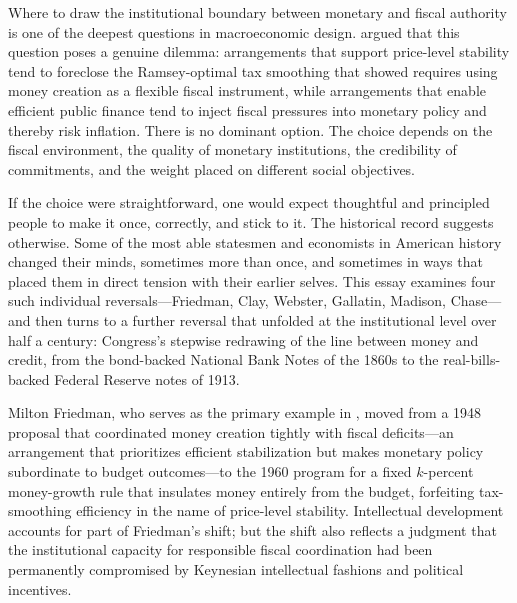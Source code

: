 \documentclass[12pt]{article}
\begin{document}
Where to draw the institutional boundary between monetary and fiscal
authority is one of the deepest questions in macroeconomic design.
\citet{Sargent2011} argued that this question poses a genuine dilemma:
arrangements that support price-level stability tend to foreclose the
Ramsey-optimal tax smoothing that \citet{LucasStokey1983} showed
requires using money creation as a flexible fiscal instrument, while
arrangements that enable efficient public finance tend to inject fiscal
pressures into monetary policy and thereby risk inflation.  There is no
dominant option.  The choice depends on the fiscal environment,
the quality of monetary institutions, the credibility of commitments,
and the weight placed on different social objectives.

If the choice were straightforward, one would expect thoughtful and
principled people to make it once, correctly, and stick to it.  The
historical record suggests otherwise.  Some of the most able statesmen
and economists in American history changed their minds, sometimes more
than once, and sometimes in ways that placed them in direct tension with
their earlier selves.  This essay examines four such individual
reversals---Friedman, Clay, Webster, Gallatin, Madison, Chase---and
then turns to a further reversal that unfolded at the institutional level
over half a century:
Congress's stepwise redrawing of the line between money and credit,
from the bond-backed National Bank Notes of the 1860s to the
real-bills-backed Federal Reserve notes of 1913.

Milton Friedman, who serves as the primary example in \citet{Sargent2011},
moved from a 1948 proposal that coordinated money creation tightly with
fiscal deficits---an arrangement that prioritizes efficient stabilization
but makes monetary policy subordinate to budget outcomes---to the 1960
program for a fixed $k$-percent money-growth rule that insulates money
entirely from the budget, forfeiting tax-smoothing efficiency in the
name of price-level stability.  Intellectual development accounts for part
of Friedman's shift; but the shift also reflects a judgment that the
institutional capacity for responsible fiscal coordination had been
permanently compromised by Keynesian intellectual fashions and political
incentives.
\end{document}
